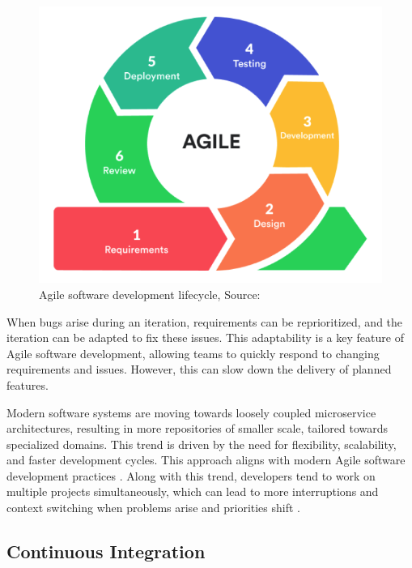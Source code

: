 \begin{figure}[H]
    \centering
    \includegraphics[width=1\textwidth]{images/agile-cycle.png}
    \caption{Agile software development lifecycle, Source: \cite{7MistakesIve2020}}
    \label{fig:agile-cycle}
\end{figure}

When bugs arise during an iteration, requirements can be reprioritized, and the iteration can be adapted to fix these issues. This adaptability is a key feature of Agile software development, allowing teams to quickly respond to changing requirements and issues. However, this can slow down the delivery of planned features. %

Modern software systems are moving towards loosely coupled microservice architectures, resulting in more repositories of smaller scale, tailored towards specialized domains. This trend is driven by the need for flexibility, scalability, and faster development cycles. This approach aligns with modern Agile software development practices \cite{francescoResearchArchitectingMicroservices2017}. Along with this trend, developers tend to work on multiple projects simultaneously, which can lead to more interruptions and context switching when problems arise and priorities shift \cite{tregubovImpactTaskSwitching2017, vasilescuSkyNotLimit2016}.

\subsection{Continuous Integration}

